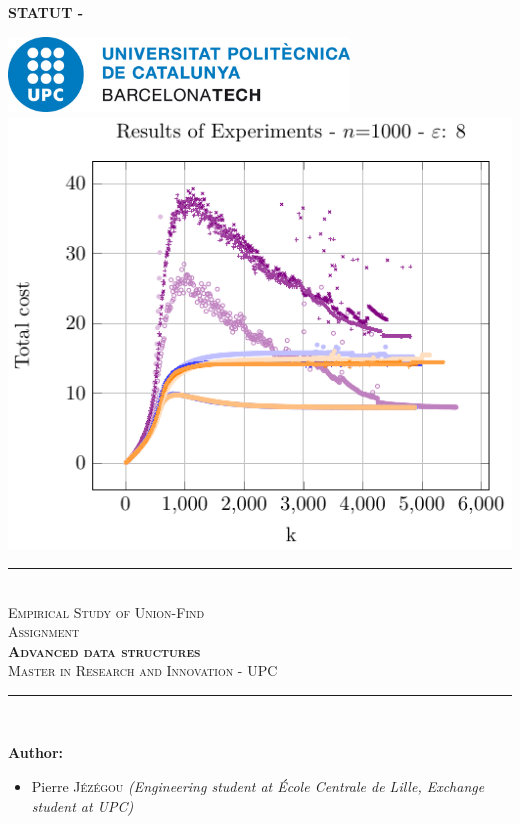 \pagestyle{plain}
\pagecolor{white}

\begin{center}
    \color{red!50!white}
    \textbf{\huge{STATUT - \documentStatus}}
\end{center}

\vfill


\color{black}
\begin{center}
    \includegraphics[height=2cm]{images/logos/upc_logo.jpeg} \\
    \vfill
    \includegraphics[width=0.6\linewidth]{includes/image_cover_page.pdf}\\
    \vfill
    \rule{\linewidth}{0.5mm} \\[1cm]
    {\Huge \textsc{\textcolor{fib_red}{Empirical Study of Union-Find}}}\\[1cm]
    {\Large \textsc{Assignment}}\\[0.4cm]
    {\huge \textsc{\textbf{Advanced data structures}}}\\[1cm]
    {\Large \textsc{Master in Research and Innovation - UPC}}\\[0.4cm]
    \rule{\linewidth}{0.5mm} \\[1.5cm]
\end{center}

\vfill

\textbf{Author:}
\begin{itemize}
\item Pierre \textsc{Jézégou}\newline
\textit{(Engineering student at École Centrale de Lille, Exchange student at UPC)}
\end{itemize}

\newpage
\color{black}
\pagecolor{white}
\pagestyle{fancy}